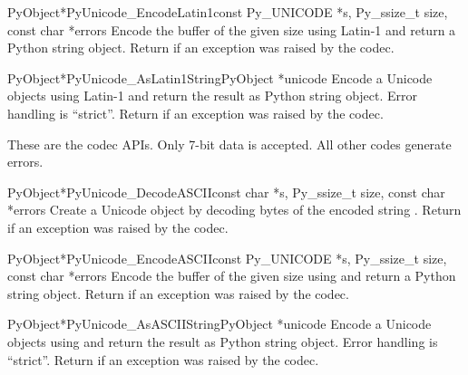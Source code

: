 \begin{cfuncdesc}{PyObject*}{PyUnicode_EncodeLatin1}{const Py_UNICODE *s,
                                                     Py_ssize_t size,
                                                     const char *errors}
  Encode the  buffer of the given size using
  Latin-1 and return a Python string object.  Return \NULL{} if an
  exception was raised by the codec.
\end{cfuncdesc}

\begin{cfuncdesc}{PyObject*}{PyUnicode_AsLatin1String}{PyObject *unicode}
  Encode a Unicode objects using Latin-1 and return the result as
  Python string object.  Error handling is ``strict''.  Return
  \NULL{} if an exception was raised by the codec.
\end{cfuncdesc}


These are the \ASCII{} codec APIs.  Only 7-bit \ASCII{} data is
accepted. All other codes generate errors.

\begin{cfuncdesc}{PyObject*}{PyUnicode_DecodeASCII}{const char *s,
                                                    Py_ssize_t size,
                                                    const char *errors}
  Create a Unicode object by decoding  bytes of the
  \ASCII{} encoded string .  Return \NULL{} if an exception
  was raised by the codec.
\end{cfuncdesc}

\begin{cfuncdesc}{PyObject*}{PyUnicode_EncodeASCII}{const Py_UNICODE *s,
                                                    Py_ssize_t size,
                                                    const char *errors}
  Encode the  buffer of the given size using
  \ASCII{} and return a Python string object.  Return \NULL{} if an
  exception was raised by the codec.
\end{cfuncdesc}

\begin{cfuncdesc}{PyObject*}{PyUnicode_AsASCIIString}{PyObject *unicode}
  Encode a Unicode objects using \ASCII{} and return the result as
  Python string object.  Error handling is ``strict''.  Return
  \NULL{} if an exception was raised by the codec.
\end{cfuncdesc}


